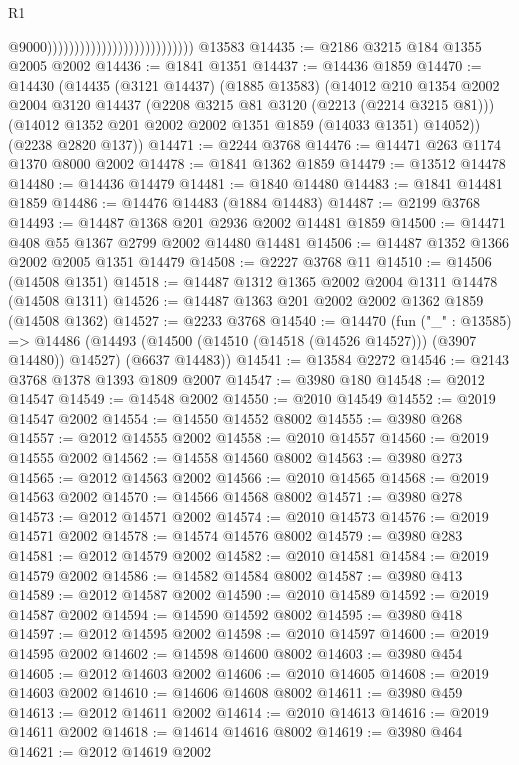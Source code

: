 \begin{lexlean}{R1}
\begin{coremodule}
                                                          @9000)))))))))))))))))))))))))))
    @13583
@14435 := @2186 @3215 @184 @1355 @2005 @2002
@14436 := @1841 @1351
@14437 := @14436 @1859
@14470 := @14430
    (@14435
      (@3121 @14437)
      (@1885 @13583)
      (@14012
        @210
        @1354
        @2002
        @2004
        @3120
        @14437
        (@2208 @3215 @81 @3120 (@2213 (@2214 @3215 @81)))
        (@14012 @1352 @201 @2002 @2002 @1351 @1859 (@14033 @1351) @14052))
      (@2238 @2820 @137))
@14471 := @2244 @3768
@14476 := @14471 @263 @1174 @1370 @8000 @2002
@14478 := @1841 @1362 @1859
@14479 := @13512 @14478
@14480 := @14436 @14479
@14481 := @1840 @14480
@14483 := @1841 @14481 @1859
@14486 := @14476 @14483 (@1884 @14483)
@14487 := @2199 @3768
@14493 := @14487 @1368 @201 @2936 @2002 @14481 @1859
@14500 := @14471 @408 @55 @1367 @2799 @2002 @14480 @14481
@14506 := @14487 @1352 @1366 @2002 @2005 @1351 @14479
@14508 := @2227 @3768 @11
@14510 := @14506 (@14508 @1351)
@14518 := @14487 @1312 @1365 @2002 @2004 @1311 @14478 (@14508 @1311)
@14526 := @14487 @1363 @201 @2002 @2002 @1362 @1859 (@14508 @1362)
@14527 := @2233 @3768
@14540 := @14470
    (fun ("_" : @13585) =>
    @14486 (@14493 (@14500 (@14510 (@14518 (@14526 @14527))) (@3907 @14480)) @14527) (@6637 @14483))
@14541 := @13584 @2272
@14546 := @2143 @3768 @1378 @1393 @1809 @2007
@14547 := @3980 @180
@14548 := @2012 @14547
@14549 := @14548 @2002
@14550 := @2010 @14549
@14552 := @2019 @14547 @2002
@14554 := @14550 @14552 @8002
@14555 := @3980 @268
@14557 := @2012 @14555 @2002
@14558 := @2010 @14557
@14560 := @2019 @14555 @2002
@14562 := @14558 @14560 @8002
@14563 := @3980 @273
@14565 := @2012 @14563 @2002
@14566 := @2010 @14565
@14568 := @2019 @14563 @2002
@14570 := @14566 @14568 @8002
@14571 := @3980 @278
@14573 := @2012 @14571 @2002
@14574 := @2010 @14573
@14576 := @2019 @14571 @2002
@14578 := @14574 @14576 @8002
@14579 := @3980 @283
@14581 := @2012 @14579 @2002
@14582 := @2010 @14581
@14584 := @2019 @14579 @2002
@14586 := @14582 @14584 @8002
@14587 := @3980 @413
@14589 := @2012 @14587 @2002
@14590 := @2010 @14589
@14592 := @2019 @14587 @2002
@14594 := @14590 @14592 @8002
@14595 := @3980 @418
@14597 := @2012 @14595 @2002
@14598 := @2010 @14597
@14600 := @2019 @14595 @2002
@14602 := @14598 @14600 @8002
@14603 := @3980 @454
@14605 := @2012 @14603 @2002
@14606 := @2010 @14605
@14608 := @2019 @14603 @2002
@14610 := @14606 @14608 @8002
@14611 := @3980 @459
@14613 := @2012 @14611 @2002
@14614 := @2010 @14613
@14616 := @2019 @14611 @2002
@14618 := @14614 @14616 @8002
@14619 := @3980 @464
@14621 := @2012 @14619 @2002

\end{coremodule}
\end{lexlean}
